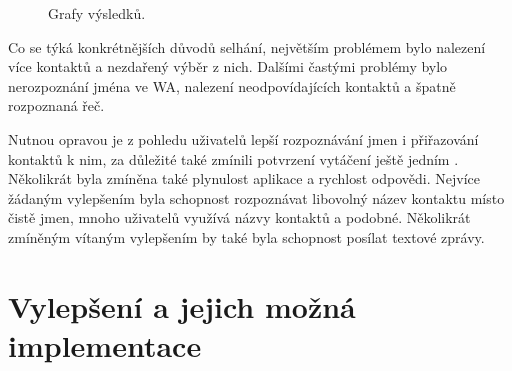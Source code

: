 \newsavebox{\tempbox}
\begin{figure}[H]
    \qquad
    \caption{Grafy výsledků.}
\end{figure}

Co se týká konkrétnějších důvodů selhání, největším problémem bylo nalezení více
kontaktů a nezdařený výběr z nich. Dalšími častými problémy bylo nerozpoznání
jména ve WA, nalezení neodpovídajících kontaktů a špatně rozpoznaná řeč.

Nutnou opravou je z pohledu uživatelů lepší rozpoznávání jmen i přiřazování
kontaktů k nim, za důležité také zmínili potvrzení vytáčení ještě jedním
. Několikrát byla zmíněna také plynulost aplikace a rychlost
odpovědi.
Nejvíce žádaným vylepšením byla schopnost rozpoznávat libovolný název kontaktu
místo čistě jmen, mnoho uživatelů využívá názvy kontaktů  a podobné.
Několikrát zmíněným vítaným vylepšením by také byla schopnost posílat textové
zprávy.

\section{Vylepšení a jejich možná implementace}\label{improvements}

